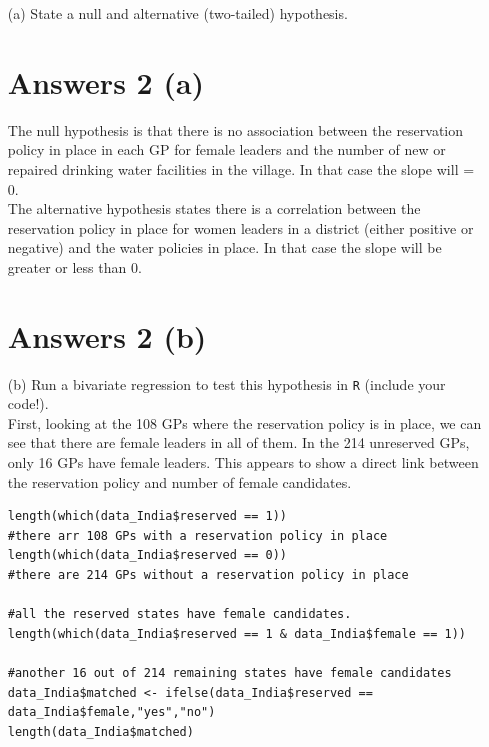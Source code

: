 \documentclass[12pt,letterpaper]{article}
\begin{document}
\newpage
\begin{enumerate}
	\item [(a)] State a null and alternative (two-tailed) hypothesis. \\
	
\section*{Answers 2 (a)}	
	
	The null hypothesis is that there is no association between the reservation policy in place in each GP for female leaders and the number of new or repaired drinking water facilities in the village. In that case the slope will = 0. \\
	
	The alternative hypothesis states there is a correlation between the reservation policy in place for women leaders in a district (either positive or negative) and the water policies in place. In that case the slope will be greater or less than 0. \\
	
	
	

	
	\newpage
	
	\section*{Answers 2 (b)}
	
		\item [(b)] Run a bivariate regression to test this hypothesis in \texttt{R} (include your code!). \\
		
	First, looking at the 108 GPs where the reservation policy is in place, we can see that there are female leaders in all of them. In the 214 unreserved GPs, only 16 GPs have female leaders. This appears to show a direct link between the reservation policy and number of female candidates.
	
	\begin{verbatim}
length(which(data_India$reserved == 1)) 
#there arr 108 GPs with a reservation policy in place
length(which(data_India$reserved == 0)) 
#there are 214 GPs without a reservation policy in place

#all the reserved states have female candidates.
length(which(data_India$reserved == 1 & data_India$female == 1))  

#another 16 out of 214 remaining states have female candidates
data_India$matched <- ifelse(data_India$reserved == data_India$female,"yes","no")
length(data_India$matched)


\end{verbatim}
\end{enumerate}
\end{document}
